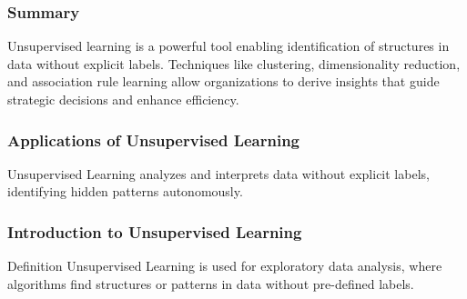 \documentclass[aspectratio=169]{beamer}
\begin{document}
\begin{frame}[fragile]
    \frametitle{Summary}
    Unsupervised learning is a powerful tool enabling identification of structures in data without explicit labels. Techniques like clustering, dimensionality reduction, and association rule learning allow organizations to derive insights that guide strategic decisions and enhance efficiency.
\end{frame}

\begin{frame}[fragile]
    \frametitle{Applications of Unsupervised Learning}
    Unsupervised Learning analyzes and interprets data without explicit labels, identifying hidden patterns autonomously.
\end{frame}

\begin{frame}[fragile]
    \frametitle{Introduction to Unsupervised Learning}
    \begin{block}{Definition}
        Unsupervised Learning is used for exploratory data analysis, where algorithms find structures or patterns in data without pre-defined labels.
    \end{block}
\end{frame}
\end{document}
